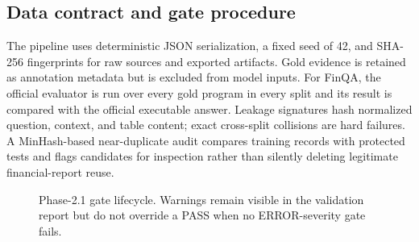 \documentclass[conference]{IEEEtran}
\begin{document}
\subsection{Data contract and gate procedure}
The pipeline uses deterministic JSON serialization, a fixed seed of 42, and SHA-256
fingerprints for raw sources and exported artifacts. Gold evidence is retained as annotation
metadata but is excluded from model inputs. For FinQA, the official evaluator is run over
every gold program in every split and its result is compared with the official executable
answer. Leakage signatures hash normalized question, context, and table content; exact
cross-split collisions are hard failures. A MinHash-based near-duplicate audit compares
training records with protected tests and flags candidates for inspection rather than
silently deleting legitimate financial-report reuse.

\begin{figure}[t]
\centering
{}
\caption{Phase-2.1 gate lifecycle. Warnings remain visible in the validation report but do
not override a PASS when no ERROR-severity gate fails.}
\label{fig:phase2-gates}
\end{figure}
\end{document}
